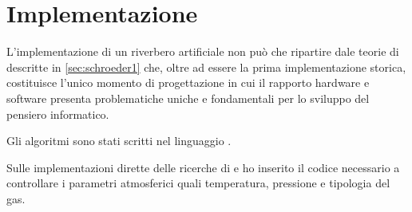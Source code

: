 
\chapter{Implementazione}
\label{chp:Implementazione}



L'implementazione di un riverbero artificiale non può che ripartire dale teorie
di \ms descritte in \ref{sec:schroeder1} che, oltre ad essere la prima
implementazione storica, costituisce l'unico momento di progettazione in cui
il rapporto hardware e software presenta problematiche uniche e fondamentali per
lo sviluppo del pensiero informatico.

Gli algoritmi sono stati scritti nel linguaggio \faust.

Sulle implementazioni dirette delle ricerche di \ms e \jam ho inserito il codice
necessario a controllare i parametri atmosferici quali temperatura, pressione e
tipologia del gas.

\clearpage

\clearpage

